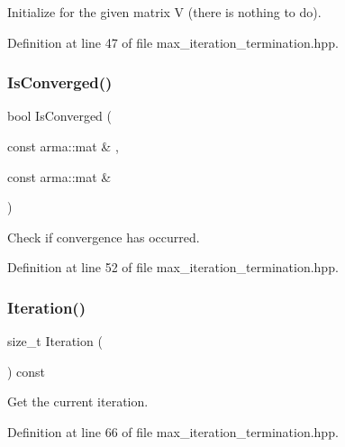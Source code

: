 Initialize for the given matrix V (there is nothing to do). 



Definition at line 47 of file max\+\_\+iteration\+\_\+termination.\+hpp.

\mbox{\label{classmlpack_1_1amf_1_1MaxIterationTermination_a1541d81ce59ddf02e5a970de45e01ecf}} 
\subsubsection{Is\+Converged()}
{\footnotesize\ttfamily bool Is\+Converged (\begin{DoxyParamCaption}\item[{const arma\+::mat \&}]{,  }\item[{const arma\+::mat \&}]{ }\end{DoxyParamCaption})\hspace{0.3cm}{\ttfamily [inline]}}



Check if convergence has occurred. 



Definition at line 52 of file max\+\_\+iteration\+\_\+termination.\+hpp.

\mbox{\label{classmlpack_1_1amf_1_1MaxIterationTermination_a8d03065ad6cf9b1807c9deb70ed63185}} 
\subsubsection{Iteration()\hspace{0.1cm}{\footnotesize\ttfamily [1/2]}}
{\footnotesize\ttfamily size\+\_\+t Iteration (\begin{DoxyParamCaption}{ }\end{DoxyParamCaption}) const\hspace{0.3cm}{\ttfamily [inline]}}



Get the current iteration. 



Definition at line 66 of file max\+\_\+iteration\+\_\+termination.\+hpp.

